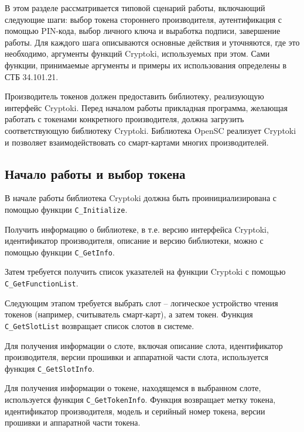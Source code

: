 В этом разделе рассматривается типовой сценарий работы,
включающий следующие шаги: выбор токена стороннего
производителя, аутентификация с помощью PIN-кода, выбор
личного ключа и выработка подписи, завершение работы.
Для каждого шага описываются основные действия и
уточняются, где это необходимо, аргументы функций Cryptoki,
используемых при этом.
Сами функции, принимаемые аргументы и примеры
их использования определены в СТБ 34.101.21.

Производитель токенов должен предоставить библиотеку,
реализующую интерфейс Cryptoki. Перед началом работы прикладная
программа, желающая работать с токенами конкретного
производителя, должна загрузить соответствующую библиотеку
Cryptoki. Библиотека OpenSC реализует Cryptoki и позволяет
взаимодействовать со смарт-картами многих производителей.

\subsection{Начало работы и выбор токена}

В начале работы библиотека Cryptoki должна быть
проинициализирована с помощью функции \verb|C_Initialize|.

Получить информацию о библиотеке, в т.е. версию интерфейса
Cryptoki, идентификатор производителя, описание и версию
библиотеки, можно с помощью функции \verb|C_GetInfo|.

Затем требуется получить список указателей на функции Cryptoki
с помощью \verb|C_GetFunctionList|.

Следующим этапом требуется выбрать слот -- логическое
устройство чтения токенов (например, считыватель смарт-карт),
а затем токен.
Функция \verb|C_GetSlotList| возвращает список слотов в системе.

Для получения информации о слоте, включая описание слота,
идентификатор производителя, версии прошивки и аппаратной
части слота, используется функция \verb|C_GetSlotInfo|.

Для получения информации о токене, находящемся в выбранном
слоте, используется функция \verb|C_GetTokenInfo|.
Функция возвращает метку токена, идентификатор производителя,
модель и серийный номер токена, версии прошивки и
аппаратной части токена.

